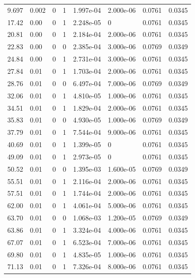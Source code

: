 \documentclass[preview]{standalone}
\begin{document}
{{\begin{tabular}{L{1.2cm}C{1.2cm} C{0.3cm}C{0.5cm} C{1.4cm}C{1.4cm} C{1.4cm}C{1.4cm}}
  9.697  &  0.002  & 0     &  1 &  1.997e-04  & 2.000e-06  & 0.0761 &  0.0345   \\ 
  17.42  &  0.00  & 0     &  1 &  2.248e-05  & 0  & 0.0761 &  0.0345   \\ 
  20.81  &  0.00  & 0     &  1 &  2.184e-04  & 2.000e-06  & 0.0761 &  0.0345   \\ 
  22.83  &  0.00  & 0     &  0 &  2.385e-04  & 3.000e-06  & 0.0769 &  0.0349   \\ 
  24.84  &  0.00  & 0     &  1 &  2.731e-04  & 3.000e-06  & 0.0761 &  0.0345   \\ 
  27.84  &  0.01  & 0     &  1 &  1.703e-04  & 2.000e-06  & 0.0761 &  0.0345   \\ 
  28.76  &  0.01  & 0     &  0 &  6.497e-04  & 7.000e-06  & 0.0769 &  0.0349   \\ 
  32.06  &  0.01  & 0     &  1 &  4.810e-05  & 1.000e-06  & 0.0761 &  0.0345   \\ 
  34.51  &  0.01  & 0     &  1 &  1.829e-04  & 2.000e-06  & 0.0761 &  0.0345   \\ 
  35.83  &  0.01  & 0     &  0 &  4.930e-05  & 1.000e-06  & 0.0769 &  0.0349   \\ 
  37.79  &  0.01  & 0     &  1 &  7.544e-04  & 9.000e-06  & 0.0761 &  0.0345   \\ 
  40.69  &  0.01  & 0     &  1 &  1.399e-05  & 0  & 0.0761 &  0.0345   \\ 
  49.09  &  0.01  & 0     &  1 &  2.973e-05  & 0  & 0.0761 &  0.0345   \\ 
  50.52  &  0.01  & 0     &  0 &  1.395e-03  & 1.600e-05  & 0.0769 &  0.0349   \\ 
  55.51  &  0.01  & 0     &  1 &  2.116e-04  & 2.000e-06  & 0.0761 &  0.0345   \\ 
  57.51  &  0.01  & 0     &  1 &  1.744e-04  & 2.000e-06  & 0.0761 &  0.0345   \\ 
  62.00  &  0.01  & 0     &  1 &  4.061e-04  & 5.000e-06  & 0.0761 &  0.0345   \\ 
  63.70  &  0.01  & 0     &  0 &  1.068e-03  & 1.200e-05  & 0.0769 &  0.0349   \\ 
  63.86  &  0.01  & 0     &  1 &  3.324e-04  & 4.000e-06  & 0.0761 &  0.0345   \\ 
  67.07  &  0.01  & 0     &  1 &  6.523e-04  & 7.000e-06  & 0.0761 &  0.0345   \\ 
  69.80  &  0.01  & 0     &  1 &  4.835e-05  & 1.000e-06  & 0.0761 &  0.0345   \\ 
  71.13  &  0.01  & 0     &  1 &  7.326e-04  & 8.000e-06  & 0.0761 &  0.0345   \\ 

\end{tabular}}}
\end{document}
